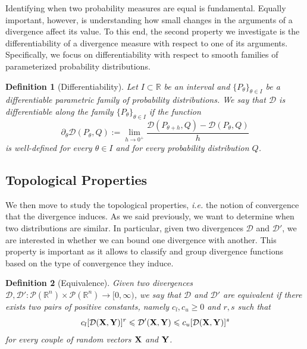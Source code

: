 \documentclass{article}
\renewcommand{\le}{\leqslant}
\renewcommand{\ge}{\geqslant}
\renewcommand{\to}{\rightarrow}
\def\bX{{\bf X}}
\def\bY{{\bf Y}}
\def \PP{\mathcal{P}}
\def \erre{\mathbb{R}}
\newtheorem{definition}{Definition}
\begin{document}
% 
Identifying when two probability measures are equal is fundamental.
% 
Equally important, however, is understanding how small changes in the arguments of a divergence affect its value.
% 
To this end, the second property we investigate is the differentiability of a divergence measure with respect to one of its arguments.
% 
Specifically, we focus on differentiability with respect to smooth families of parameterized probability distributions.
% 

\begin{definition}[Differentiability]
    Let $I\subset\erre$ be an interval and $\{P_\theta\}_{\theta \in I}$ be a differentiable parametric family of probability distributions. We say that $\mathcal{D}$ is differentiable along the family $\{P_\theta\}_{\theta \in I}$ if the function
    \[
        \partial_\theta\mathcal{D}(P_\theta,Q):=\lim_{h\to0^+}\frac{\mathcal{D}(P_{\theta+h},Q)-\mathcal{D}(P_\theta,Q)}{h}
    \]
    is well-defined for every $\theta\in I$ and for every probability distribution $Q$.
\end{definition}


% 
% 







\subsection{Topological Properties}

% 

% 
We then move to study the topological properties, \textit{i.e.} the notion of convergence that the divergence induces.
% 
As we said previously, we want to determine when two distributions are similar.
% 
In particular, given two divergences $\mathcal{D}$ and $\mathcal{D}'$, we are interested in whether we can bound one divergence with another.
% 
This property is important as it allows to classify and group divergence functions based on the type of convergence they induce.
% 

\begin{definition}[Equivalence]
    \label{def:equivalence}
    Given two divergences $ \mathcal{D}, \mathcal{D}':\PP(\erre^n)\times\PP(\erre^n)\to[0,\infty)$, we say that $ \mathcal{D}$ and $ \mathcal{D}'$ are equivalent if there exists two pairs of positive constants, namely $c_l,c_u\ge 0$ and $r,s$ such that
    \begin{equation}
        \label{eq:def_equivalence}
        c_l[ \mathcal{D}(\bX,\bY)]^r\le \mathcal{D}'(\bX,\bY)\le c_u[ \mathcal{D}(\bX,\bY)]^s
    \end{equation}
    for every couple of random vectors $\bX$ and $\bY$.
\end{definition}
\end{document}
